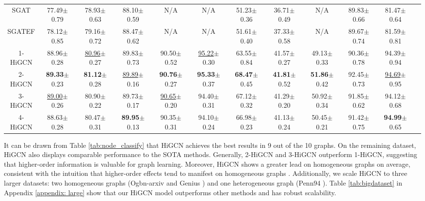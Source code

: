 \documentclass[letterpaper]{article} \usepackage{aaai24}
\newcommand \spm[1] {\footnotesize{$\pm$#1} }
\newcommand \f[1]{\textbf{#1}}
\newcommand \s[1]{\underline{#1}}
\newcommand \thi[1]{#1}
\theoremstyle{plain}
\theoremstyle{definition}
\theoremstyle{remark}
\begin{document}
\begin{table*}[!ht]
{\begin{tabular}{cccccccccccc}
SGAT &77.49\spm{0.79}  &78.93\spm{0.63} &88.10\spm{0.59} &N/A           &N/A               &51.23\spm{0.36}  &36.71\spm{0.49}  &N/A            &89.83\spm{0.66}  &81.47\spm{0.64}\\
SGATEF &78.12\spm{0.85}  &79.16\spm{0.72} &88.47\spm{0.62} &N/A           &N/A               &51.61\spm{0.40}  &37.33\spm{0.58}  &N/A            &89.67\spm{0.74}  &81.59\spm{0.81}\\
1-HiGCN
&\thi{88.96}\spm{0.28}  &\s{80.96}\spm{0.27}  &\thi{89.83}\spm{0.73}  &\thi{90.50}\spm{0.52}  &\s{95.22}\spm{0.30} &63.55\spm{0.84}  &\thi{41.57}\spm{0.27}  &49.13\spm{0.33}  &90.36\spm{0.78} &\thi{94.39}\spm{0.94}\\
2-HiGCN
&\f{89.33}\spm{0.23}  &\f{81.12}\spm{0.28}  &\s{89.89}\spm{0.16}  &\f{90.76}\spm{0.27}  &\f{95.33}\spm{0.37}  &\f{68.47}\spm{0.45}  &\f{41.81}\spm{0.52}  &\f{51.86}\spm{0.42}  &\thi{92.45}\spm{0.73}      &\s{94.69}\spm{0.95}\\
3-HiGCN
&\s{89.00}\spm{0.26}  &\thi{80.90}\spm{0.22}  &89.73\spm{0.17} &\s{90.65}\spm{0.20} &\thi{94.40}\spm{0.31} &67.12\spm{0.32} &41.29\spm{0.20} &\thi{50.92}\spm{0.34}  &91.85\spm{0.62}          &94.12\spm{0.68}\\
4-HiGCN
&88.63\spm{0.28}  &80.47\spm{0.31}  &\f{89.95}\spm{0.13} &90.35\spm{0.31} &94.10\spm{0.24} &66.98\spm{0.23} &41.13\spm{0.24} &50.45\spm{0.21}  &91.42\spm{0.75}  &\f{94.99}\spm{0.65}\\
\bottomrule
\end{tabular}}
\caption{Node classification results on empirical benchmark networks: mean accuracy $(\%)\pm 95\%$ confidence interval. The best results are in bold, while the second-best ones are
underlined.}
\label{tab:node_classify}
\end{table*}



It can be drawn from Table \ref{tab:node_classify} that HiGCN achieves the best results in 9 out of the 10 graphs. 
On the remaining dataset, HiGCN also displays comparable performance to the SOTA methods.
Generally, 2-HiGCN and 3-HiGCN outperform 1-HiGCN, suggesting that higher-order information is valuable for graph learning.
Moreover, HiGCN shows a greater lead on homogeneous graphs on average, consistent with the intuition that higher-order effects tend to manifest on homogeneous graphs \cite{HigherOrderReview2020}.
Additionally, we scale HiGCN to three larger datasets: two homogeneous graphs (Ogbn-arxiv \cite{data:ogbn_arxiv} and Genius \cite{data:genius}) and one heterogeneous graph (Penn94 \cite{data:penn94}). 
Table \ref{tab:bigdataset} in Appendix \ref{appendix: large} show that our HiGCN model outperforms other methods and has robust scalability.
\end{document}
